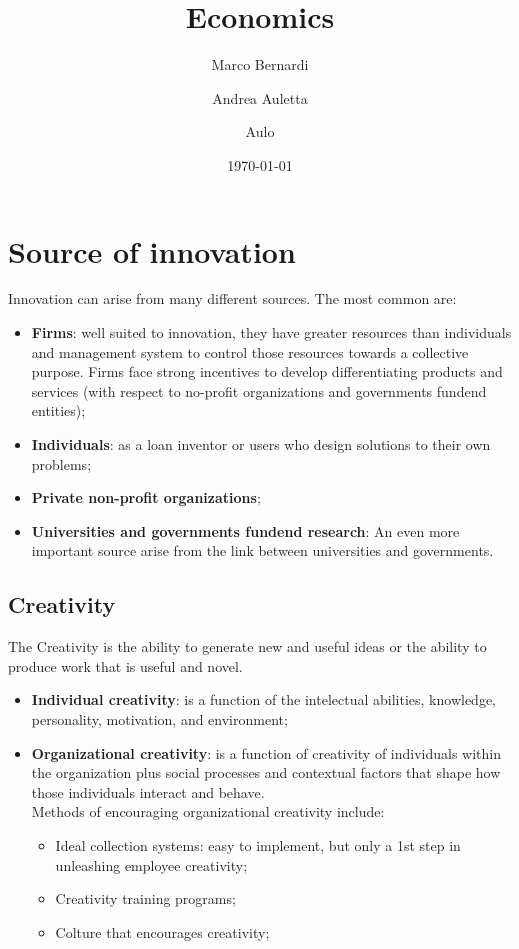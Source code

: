 \documentclass[12pt]{article}
\title{Economics}
\author{
    Marco Bernardi
    \and
    Andrea Auletta
    \and
    Aulo
}
\date{\today}
\begin{document}
\maketitle
\tableofcontents
\section{Source of innovation}
Innovation can arise from many different sources. The most common are:
\begin{itemize}
    \item \textbf{Firms}: well suited to innovation, they have greater resources than individuals and management system to control those resources towards a collective purpose.
    Firms face strong incentives to develop differentiating products and services (with respect to no-profit organizations and governments fundend entities);
    \item \textbf{Individuals}: as a loan inventor or users who design solutions to their own problems;
    \item \textbf{Private non-profit organizations};
    \item \textbf{Universities and governments fundend research}: An even more important source arise from the link between universities and governments.
\end{itemize}
\subsection{Creativity}
The Creativity is the ability to generate new and useful ideas or the ability to produce work that is useful and novel.
\begin{itemize}
    \item \textbf{Individual creativity}: is a function of the intelectual abilities, knowledge, personality, motivation, and environment;
    \item \textbf{Organizational creativity}: is a function of creativity of individuals within the organization plus social processes and contextual factors that shape how those individuals 
    interact and behave.\\
    Methods of encouraging organizational creativity include:
    \begin{itemize}
        \item Ideal collection systems: easy to implement, but only a 1st step in unleashing employee creativity;
        \item Creativity training programs;
        \item Colture that encourages creativity;
    \end{itemize}
\end{itemize}
\end{document}
